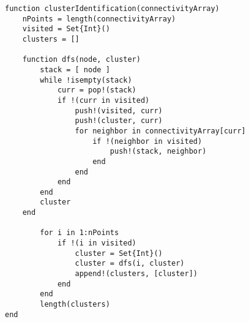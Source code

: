\begin{lstlisting}
function clusterIdentification(connectivityArray)
    nPoints = length(connectivityArray)
    visited = Set{Int}()
    clusters = []

    function dfs(node, cluster)
        stack = [ node ]
        while !isempty(stack)
            curr = pop!(stack)
            if !(curr in visited)
                push!(visited, curr)
                push!(cluster, curr)
                for neighbor in connectivityArray[curr]
                    if !(neighbor in visited)
                        push!(stack, neighbor)
                    end
                end
            end
        end
        cluster
    end

        for i in 1:nPoints
            if !(i in visited)
                cluster = Set{Int}()
                cluster = dfs(i, cluster)
                append!(clusters, [cluster])
            end
        end
        length(clusters)
end
	
\end{lstlisting}
